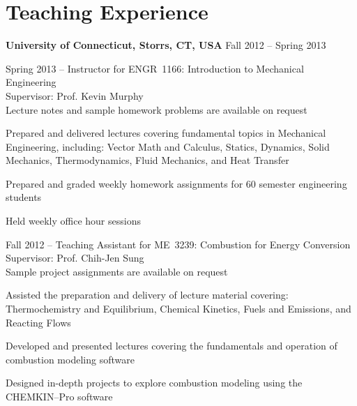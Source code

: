 \section{Teaching Experience}
\textbf{University of Connecticut, Storrs, CT, USA} \hfill Fall 2012 --
                                                           Spring 2013
\begin{outerlist}
    \item[] Spring 2013 -- Instructor for ENGR~1166: Introduction to
            Mechanical Engineering\\
            Supervisor: Prof. Kevin Murphy\\
            Lecture notes and sample homework problems are
            available on request
        \begin{innerlist}
            \item Prepared and delivered lectures covering fundamental
                  topics in Mechanical Engineering, including: Vector
                  Math and Calculus, Statics, Dynamics, Solid
                  Mechanics, Thermodynamics, Fluid Mechanics, and Heat
                  Transfer
            \item Prepared and graded weekly homework assignments for
                  60  semester engineering students
            \item Held weekly office hour sessions
        \end{innerlist}

   \item[] Fall 2012 -- Teaching Assistant for ME~3239: Combustion for
           Energy Conversion\\
           Supervisor: Prof. Chih-Jen Sung\\
           Sample project assignments are available on request
        \begin{innerlist}
            \item Assisted the preparation and delivery of lecture 
                  material covering: Thermochemistry and Equilibrium, 
                  Chemical Kinetics, Fuels and Emissions, and Reacting 
                  Flows
            \item Developed and presented lectures covering the
                  fundamentals and operation of combustion modeling 
                  software
            \item Designed in-depth projects to explore combustion 
                  modeling using the \\ 
                  CHEMKIN--Pro software
        \end{innerlist}

\end{outerlist}


